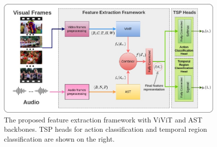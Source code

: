\begin{figure}
\centering
\includegraphics[width=\linewidth]{assets/img/tsp/tsp-arch-colourrr.jpg}
\caption{The proposed feature extraction framework with ViViT and AST backbones. TSP heads for action classification and temporal region classification are shown on the right.}
\label{fig:tsp-arch}
\end{figure}

